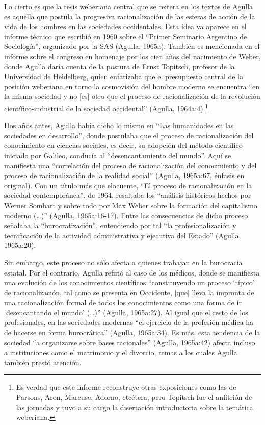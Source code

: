 Lo cierto es que la tesis weberiana central que se reitera en los textos de Agulla es aquella que postula la progresiva racionalización de las esferas de acción de la vida de los hombres en las sociedades occidentales. Esta idea ya aparece en el informe técnico que escribió en 1960 sobre el ``Primer Seminario Argentino de Sociología'', organizado por la SAS (Agulla, 1965a). También es mencionada en el informe sobre el congreso en homenaje por los cien años del nacimiento de Weber, donde Agulla daría cuenta de la postura de Ernst Topitsch, profesor de la Universidad de Heidelberg, quien enfatizaba que el presupuesto central de la posición weberiana en torno la cosmovisión del hombre moderno se encuentra ``en la misma sociedad y no [es] otro que el proceso de racionalización de la revolución científico-industrial de la sociedad occidental'' (Agulla, 1964a:4).\footnote{Es verdad que este informe reconstruye otras exposiciones como las de Parsons, Aron, Marcuse, Adorno, etcétera, pero Topitsch fue el anfitrión de las jornadas y tuvo a su cargo la disertación introductoria sobre la temática weberiana.}

Dos años antes, Agulla había dicho lo mismo en ``Las humanidades en las sociedades en desarrollo'', donde postulaba que el proceso de racionalización del conocimiento en ciencias sociales, es decir, su adopción del método científico iniciado por Galileo, conducía al ``desencantamiento del mundo''. Aquí se manifiesta una ``correlación del proceso de racionalización del conocimiento y del proceso de racionalización de la realidad social'' (Agulla, 1965a:67, énfasis en original). Con un título más que elocuente, ``El proceso de racionalización en la sociedad contemporánea'', de 1964, resaltaba los ``análisis históricos hechos por Werner Sombart y sobre todo por Max Weber sobre la formación del capitalismo moderno (\dots)'' (Agulla, 1965a:16-17). Entre las consecuencias de dicho proceso señalaba la ``burocratización'', entendiendo por tal ``la profesionalización y tecnificación de la actividad administrativa y ejecutiva del Estado'' (Agulla, 1965a:20).

Sin embargo, este proceso no sólo afecta a quienes trabajan en la burocracia estatal. Por el contrario, Agulla refirió al caso de los médicos, donde se manifiesta una evolución de los conocimientos científicos ``constituyendo un proceso `típico' de racionalización, tal como se presenta en Occidente, [que] lleva la impronta de una racionalización formal de todos los conocimientos como una forma de ir `desencantando el mundo' (\dots)'' (Agulla, 1965a:27). Al igual que el resto de los profesionales, en las sociedades modernas ``el ejercicio de la profesión médica ha de hacerse en forma burocrática'' (Agulla, 1965a:34). Es más, esta tendencia de la sociedad ``a organizarse sobre bases racionales'' (Agulla, 1965a:42) afecta incluso a instituciones como el matrimonio y el divorcio, temas a los cuales Agulla también prestó atención.

